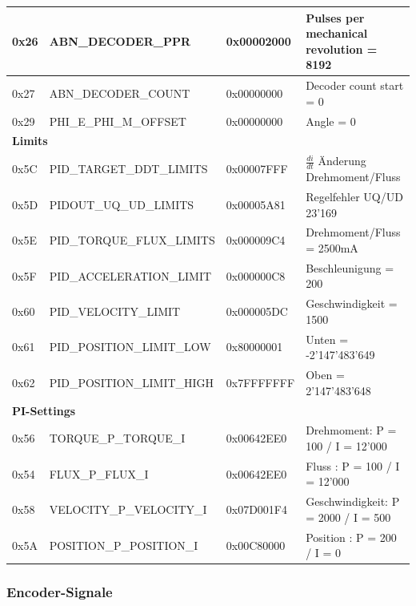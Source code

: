 \begin{table}[H]
\begin{tabularx}{\linewidth}{|l|l|l|X|}
0x26         & ABN\_DECODER\_PPR             & 0x00002000 & Pulses per mechanical revolution = 8192 \\ \hline
0x27         & ABN\_DECODER\_COUNT           & 0x00000000 & Decoder count start = 0 \\ \hline
0x29         & PHI\_E\_PHI\_M\_OFFSET  & 0x00000000 & Angle = 0    \\ \hline
\multicolumn{4}{|l|}{\textbf{Limits}}                         \\ \hline
0x5C         & PID\_TARGET\_DDT\_LIMITS & 0x00007FFF & $\frac{di}{dt}$ Änderung Drehmoment/Fluss   \\ \hline
0x5D         & PIDOUT\_UQ\_UD\_LIMITS         & 0x00005A81 &    Regelfehler UQ/UD 23'169\\ \hline
0x5E         & PID\_TORQUE\_FLUX\_LIMITS      & 0x000009C4 &    Drehmoment/Fluss = 2500mA\\ \hline
0x5F         & PID\_ACCELERATION\_LIMIT      & 0x000000C8 & Beschleunigung = 200     \\ \hline
0x60         & PID\_VELOCITY\_LIMIT          & 0x000005DC & Geschwindigkeit = 1500    \\ \hline
0x61         & PID\_POSITION\_LIMIT\_LOW & 0x80000001 &    Unten = -2'147'483'649 \\ \hline
0x62         & PID\_POSITION\_LIMIT\_HIGH     & 0x7FFFFFFF & Oben  = 2'147'483'648  \\ \hline
\multicolumn{4}{|l|}{\textbf{PI-Settings}}       \\ \hline
0x56         & TORQUE\_P\_TORQUE\_I    & 0x00642EE0 &  Drehmoment: P = 100 / I = 12'000   \\ \hline
0x54         & FLUX\_P\_FLUX\_I  & 0x00642EE0 &  Fluss : P = 100 / I = 12'000   \\ \hline
0x58         & VELOCITY\_P\_VELOCITY\_I  & 0x07D001F4 & Geschwindigkeit: P = 2000 / I = 500    \\ \hline
0x5A         & POSITION\_P\_POSITION\_I  & 0x00C80000 & Position : P = 200 / I = 0    \\ \hline
\end{tabularx}
\end{table}


\subsubsection{Encoder-Signale}\label{Appendix:ABN_Signale}


